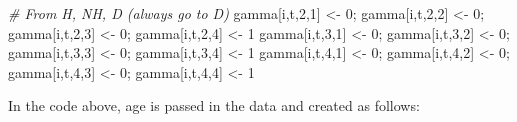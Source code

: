\documentclass[
  12pt,
]{krantz}
\newenvironment{Shaded}{\begin{snugshade}}{\end{snugshade}}
\newcommand{\CommentTok}[1]{\textcolor[rgb]{0.56,0.35,0.01}{\textit{#1}}}
\newcommand{\DecValTok}[1]{\textcolor[rgb]{0.00,0.00,0.81}{#1}}
\newcommand{\NormalTok}[1]{#1}
\newcommand{\OtherTok}[1]{\textcolor[rgb]{0.56,0.35,0.01}{#1}}
\begin{document}
\begin{Shaded}
\begin{Highlighting}[]
\CommentTok{\# From H, NH, D (always go to D)}
\NormalTok{gamma[i,t,}\DecValTok{2}\NormalTok{,}\DecValTok{1}\NormalTok{] }\OtherTok{\textless{}{-}} \DecValTok{0}\NormalTok{; gamma[i,t,}\DecValTok{2}\NormalTok{,}\DecValTok{2}\NormalTok{] }\OtherTok{\textless{}{-}} \DecValTok{0}\NormalTok{; gamma[i,t,}\DecValTok{2}\NormalTok{,}\DecValTok{3}\NormalTok{] }\OtherTok{\textless{}{-}} \DecValTok{0}\NormalTok{; gamma[i,t,}\DecValTok{2}\NormalTok{,}\DecValTok{4}\NormalTok{] }\OtherTok{\textless{}{-}} \DecValTok{1}
\NormalTok{gamma[i,t,}\DecValTok{3}\NormalTok{,}\DecValTok{1}\NormalTok{] }\OtherTok{\textless{}{-}} \DecValTok{0}\NormalTok{; gamma[i,t,}\DecValTok{3}\NormalTok{,}\DecValTok{2}\NormalTok{] }\OtherTok{\textless{}{-}} \DecValTok{0}\NormalTok{; gamma[i,t,}\DecValTok{3}\NormalTok{,}\DecValTok{3}\NormalTok{] }\OtherTok{\textless{}{-}} \DecValTok{0}\NormalTok{; gamma[i,t,}\DecValTok{3}\NormalTok{,}\DecValTok{4}\NormalTok{] }\OtherTok{\textless{}{-}} \DecValTok{1}
\NormalTok{gamma[i,t,}\DecValTok{4}\NormalTok{,}\DecValTok{1}\NormalTok{] }\OtherTok{\textless{}{-}} \DecValTok{0}\NormalTok{; gamma[i,t,}\DecValTok{4}\NormalTok{,}\DecValTok{2}\NormalTok{] }\OtherTok{\textless{}{-}} \DecValTok{0}\NormalTok{; gamma[i,t,}\DecValTok{4}\NormalTok{,}\DecValTok{3}\NormalTok{] }\OtherTok{\textless{}{-}} \DecValTok{0}\NormalTok{; gamma[i,t,}\DecValTok{4}\NormalTok{,}\DecValTok{4}\NormalTok{] }\OtherTok{\textless{}{-}} \DecValTok{1}
\end{Highlighting}
\end{Shaded}

In the code above, age is passed in the data and created as follows:
\end{document}
